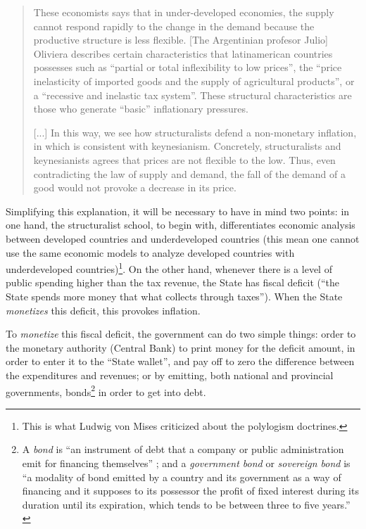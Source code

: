 \documentclass[12pt,a4paper,twoside]{book}
\begin{document}
\begin{quotation}
These economists says that in under-developed economies, the supply cannot respond rapidly to the change in the demand because the productive structure is less flexible. [The Argentinian profesor Julio] Oliviera describes certain characteristics that latinamerican countries possesses such as “partial or total inflexibility to low prices”, the “price inelasticity of imported goods and the supply of agricultural products”, or a “recessive and inelastic tax system”. These structural characteristics are those who generate “basic” inflationary pressures.

[...] In this way, we see how structuralists defend a non-monetary inflation, in which is consistent with keynesianism. Concretely, structuralists and keynesianists agrees that prices are not flexible to the low. Thus, even contradicting the law of supply and demand, the fall of the demand of a good would not provoke a decrease in its price. \cite[p. 467-468]{elementos-econopol}
\end{quotation}

Simplifying this explanation, it will be necessary to have in mind two points: in one hand, the structuralist school, to begin with, differentiates economic analysis between developed countries and underdeveloped countries (this mean one cannot use the same economic models to analyze developed countries with underdeveloped countries)\footnote{This is what Ludwig von Mises criticized about the polylogism doctrines.}. On the other hand, whenever there is a level of public spending higher than the tax revenue, the State has fiscal deficit (“the State spends more money that what collects through taxes”). When the State \textit{monetizes} this deficit, this provokes inflation.

To \textit{monetize} this fiscal deficit, the government can do two simple things: order to the monetary authority (Central Bank) to print money for the deficit amount, in order to enter it to the “State wallet”, and pay off to zero the difference between the expenditures and revenues; or by emitting, both national and provincial governments, bonds\footnote{A \textit{bond} is “an instrument of debt that a company or public administration emit for financing themselves” \cite{epedia:bono}; and a \textit{government bond} or \textit{sovereign bond} is “a modality of bond emitted by a country and its government as a way of financing and it supposes to its possessor the profit of fixed interest during its duration until its expiration, which tends to be between three to five years.” \cite{epedia:bono-estado}} in order to get into debt.
\end{document}
